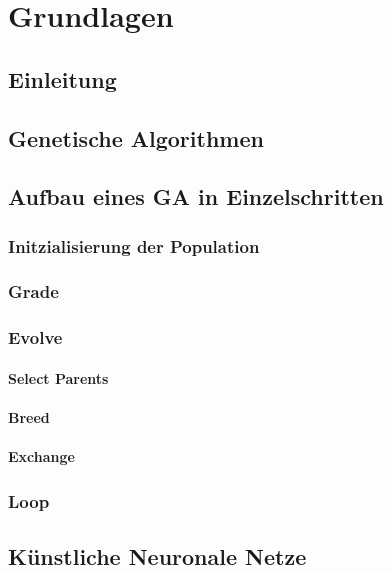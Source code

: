 
\section{Grundlagen}
\label{sec:Grundlagen}
\subsection{Einleitung}

\subsection{Genetische Algorithmen}

\subsection{Aufbau eines GA in Einzelschritten}
\subsubsection{Initzialisierung der Population}
\subsubsection{Grade}
\subsubsection{Evolve}
\paragraph{Select Parents}
\paragraph{Breed}
\paragraph{Exchange}
\subsubsection{Loop}

\newpage

\subsection{Künstliche Neuronale Netze}


